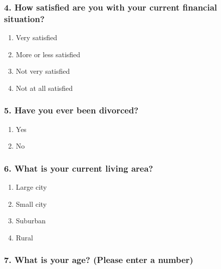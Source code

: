 \documentclass[
  letterpaper,
  DIV=11,
  numbers=noendperiod]{scrartcl}
\providecommand{\tightlist}{%
  \setlength{\itemsep}{0pt}\setlength{\parskip}{0pt}}\usepackage{longtable,booktabs,array}
\begin{document}
\hypertarget{how-satisfied-are-you-with-your-current-financial-situation}{%
\subsubsection{4. How satisfied are you with your current financial
situation?}\label{how-satisfied-are-you-with-your-current-financial-situation}}

\begin{enumerate}
\def\labelenumi{\alph{enumi}.}
\tightlist
\item
  Very satisfied
\item
  More or less satisfied
\item
  Not very satisfied
\item
  Not at all satisfied
\end{enumerate}

\hypertarget{have-you-ever-been-divorced}{%
\subsubsection{5. Have you ever been
divorced?}\label{have-you-ever-been-divorced}}

\begin{enumerate}
\def\labelenumi{\alph{enumi}.}
\tightlist
\item
  Yes
\item
  No
\end{enumerate}

\hypertarget{what-is-your-current-living-area}{%
\subsubsection{6. What is your current living
area?}\label{what-is-your-current-living-area}}

\begin{enumerate}
\def\labelenumi{\alph{enumi}.}
\tightlist
\item
  Large city
\item
  Small city
\item
  Suburban
\item
  Rural
\end{enumerate}

\hypertarget{what-is-your-age-please-enter-a-number}{%
\subsubsection{7. What is your age? (Please enter a
number)}\label{what-is-your-age-please-enter-a-number}}
\end{document}
